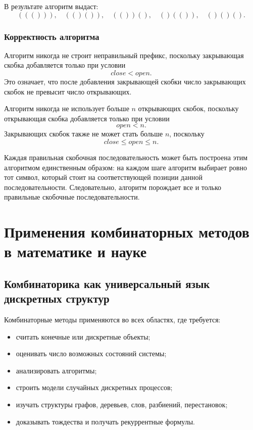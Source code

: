 \documentclass[12pt,a4paper]{article}
\begin{document}
В результате алгоритм выдаст:
\[
((())),\quad (()()),\quad (())(),\quad ()(()),\quad ()()().
\]

\subsubsection*{Корректность алгоритма}

Алгоритм никогда не строит неправильный префикс, поскольку закрывающая скобка добавляется только при условии
\[
close<open.
\]
Это означает, что после добавления закрывающей скобки число закрывающих скобок не превысит число открывающих.

Алгоритм никогда не использует больше $n$ открывающих скобок, поскольку открывающая скобка добавляется только при условии
\[
open<n.
\]
Закрывающих скобок также не может стать больше $n$, поскольку
\[
close\le open\le n.
\]

Каждая правильная скобочная последовательность может быть построена этим алгоритмом единственным образом: на каждом шаге алгоритм выбирает ровно тот символ, который стоит на соответствующей позиции данной последовательности. Следовательно, алгоритм порождает все и только правильные скобочные последовательности.

\section{Применения комбинаторных методов в математике и науке}

\subsection{Комбинаторика как универсальный язык дискретных структур}

Комбинаторные методы применяются во всех областях, где требуется:
\begin{itemize}
    \item считать конечные или дискретные объекты;
    \item оценивать число возможных состояний системы;
    \item анализировать алгоритмы;
    \item строить модели случайных дискретных процессов;
    \item изучать структуры графов, деревьев, слов, разбиений, перестановок;
    \item доказывать тождества и получать рекуррентные формулы.
\end{itemize}
\end{document}
